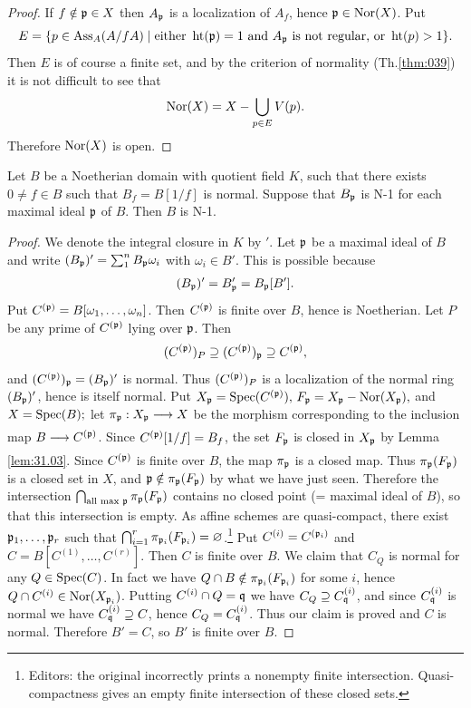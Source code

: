 \documentclass[../main]{subfiles}
\begin{document}
\begin{proof}
If $f \notin \mathfrak{p} \in X$ then $A_{\mathfrak{p}}$ is a localization of $A_{f}$, hence $\mathfrak{p} \in \operatorname{Nor}(X)$. Put \[E=\{p \in \operatorname{Ass}_{A}(A / f A) \mid \text{either }\operatorname{ht}(\mathfrak{p})=1\text{ and } A_{\mathfrak{p}}\text{ is not regular, or }\operatorname{ht}(p)>1\}.\] Then $E$ is of course a finite set, and by the criterion of normality (Th.\ref{thm:039}) it is not difficult to see that
\[
\operatorname{Nor}(X)=X-\bigcup_{p \in E} V(p) .
\]
Therefore $\operatorname{Nor}(X)$ is open.
\end{proof}
\begin{lemma}\label{lem:31.04} Let $B$ be a Noetherian domain with quotient field $K$, such that there exists $0 \neq f \in B$ such that $B_{f}=B[1 / f]$ is normal. Suppose that $B_{\mathfrak{p}}$ is N-1 for each maximal ideal $\mathfrak{p}$ of $B$. Then $B$ is N-1.\end{lemma}
\begin{proof}
We denote the integral closure in $K$ by $'$. Let $\mathfrak{p}$ be a maximal ideal of $B$ and write $(B_{\mathfrak{p}})'=\sum_{1}^{n} B_{\mathfrak{p}}\omega_{i}$ with $\omega_{i} \in B'$. This is possible because \[(B_{\mathfrak{p}})'=B'_{\mathfrak{p}}=B_{\mathfrak{p}}[B'].\] Put $C^{(\mathfrak{p})}=B[\omega_{1}, \dots, \omega_{n}]$. Then $C^{(\mathfrak{p})}$ is finite over $B$, hence is Noetherian. Let $P$ be any prime of $C^{(\mathfrak{p})}$ lying over $\mathfrak{p}$. Then \[(C^{(\mathfrak{p})})_{P}\supseteq (C^{(\mathfrak{p})})_{\mathfrak{p}} \supseteq C^{(\mathfrak{p})},\] and $(C^{(\mathfrak{p})})_{\mathfrak{p}}=(B_{\mathfrak{p}})'$ is normal. Thus $(C^{(\mathfrak{p})})_{P}$ is a localization of the normal ring $(B_{\mathfrak{p}})'$, hence is itself normal. Put $X_{\mathfrak{p}}=\operatorname{Spec}(C^{(\mathfrak{p})}),\, F_{\mathfrak{p}}=X_{\mathfrak{p}}-\operatorname{Nor}(X_{\mathfrak{p}}),$ and $X=\operatorname{Spec}(B) ;$ let $\pi_\ideal{p}: X_\ideal{p} \varrightarrow{} X$ be the morphism corresponding to the inclusion map $B \varrightarrow{} C^{(\ideal{p})}$. Since $C^{(\mathfrak{p})}[1 / f]=B_{f}$, the set $F_{\mathfrak{p}}$ is closed in $X_{\mathfrak{p}}$ by Lemma \ref{lem:31.03}. Since $C^{(\mathfrak{p})}$ is finite over $B$, the map $\pi_{\mathfrak{p}}$ is a closed map. Thus $\pi_{\mathfrak{p}}(F_{\mathfrak{p}})$ is a closed set in $X$, and $\mathfrak{p} \notin \pi_{\mathfrak{p}}(F_{\mathfrak{p}})$ by what we have just seen. Therefore the intersection $\bigcap_{\text{all max } \mathfrak{p}}\pi_{\mathfrak{p}}(F_{\mathfrak{p}})$ contains no closed point (= maximal ideal of $B$), so that this intersection is empty. As affine schemes are quasi-compact, there exist $\mathfrak{p}_{1}, \dots, \mathfrak{p}_{r}$ such that $\bigcap_{i=1}^r \pi_{\mathfrak{p}_i}(F_{\mathfrak{p}_{i}}) = \varnothing$.\footnote{Editors: the original incorrectly prints a nonempty finite intersection. Quasi-compactness gives an empty finite intersection of these closed sets.} Put $C^{(i)}=C^{(\mathfrak{p}_{i})}$ and $C=B[C^{(1)}, \ldots, C^{(r)}]$. Then $C$ is finite over $B$.
We claim that $C_Q$ is normal for any $Q\in\operatorname{Spec}(C)$. In fact we have $Q\cap B\notin\pi_{\mathfrak{p}_i}(F_{\mathfrak{p}_i})$ for some $i$, hence $Q\cap C^{(i)}\in\operatorname{Nor}(X_{\mathfrak{p}_i})$. Putting $C^{(i)}\cap Q=\mathfrak{q}$ we have $C_Q\supseteq C^{(i)}_{\mathfrak{q}}$, and since $C^{(i)}_{\mathfrak{q}}$ is normal we have $C^{(i)}_{\mathfrak{q}}\supseteq C$, hence $C_Q=C^{(i)}_{\mathfrak{q}}$. Thus our claim is proved and $C$ is normal. Therefore $B'=C$, so $B'$ is finite over $B$.\end{proof}
\end{document}
